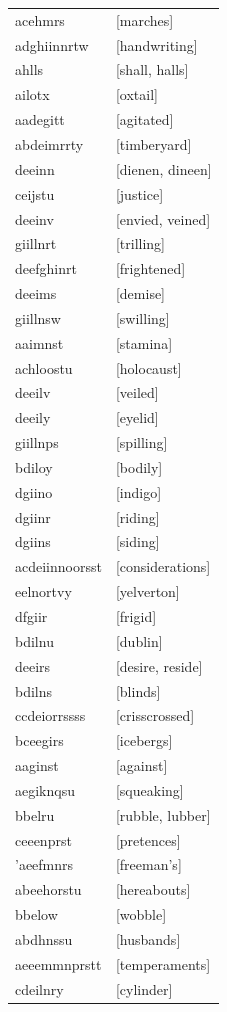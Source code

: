 \documentclass{article}
\begin{document}
\begin{tabular}{ll}
acehmrs & [marches] \\
adghiinnrtw & [handwriting] \\
ahlls & [shall, halls] \\
ailotx & [oxtail] \\
aadegitt & [agitated] \\
abdeimrrty & [timberyard] \\
deeinn & [dienen, dineen] \\
ceijstu & [justice] \\
deeinv & [envied, veined] \\
giillnrt & [trilling] \\
deefghinrt & [frightened] \\
deeims & [demise] \\
giillnsw & [swilling] \\
aaimnst & [stamina] \\
achloostu & [holocaust] \\
deeilv & [veiled] \\
deeily & [eyelid] \\
giillnps & [spilling] \\
bdiloy & [bodily] \\
dgiino & [indigo] \\
dgiinr & [riding] \\
dgiins & [siding] \\
acdeiinnoorsst & [considerations] \\
eelnortvy & [yelverton] \\
dfgiir & [frigid] \\
bdilnu & [dublin] \\
deeirs & [desire, reside] \\
bdilns & [blinds] \\
ccdeiorrssss & [crisscrossed] \\
bceegirs & [icebergs] \\
aaginst & [against] \\
aegiknqsu & [squeaking] \\
bbelru & [rubble, lubber] \\
ceeenprst & [pretences] \\
'aeefmnrs & [freeman's] \\
abeehorstu & [hereabouts] \\
bbelow & [wobble] \\
abdhnssu & [husbands] \\
aeeemmnprstt & [temperaments] \\
cdeilnry & [cylinder] \\

\end{tabular}
\end{document}
